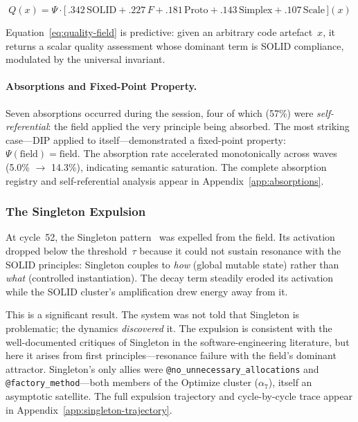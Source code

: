 \begin{eqbox}
\begin{equation}\label{eq:quality-field}
Q(x) = \Psi \!\cdot\! \bigl[\,
  .342\,\text{SOLID}
  + .227\,F
  + .181\,\text{Proto}
  + .143\,\text{Simplex}
  + .107\,\text{Scale}
\,\bigr](x)
\end{equation}
\end{eqbox}

\noindent
Equation~\eqref{eq:quality-field} is predictive: given an arbitrary
code artefact~$x$, it returns a scalar quality assessment
whose dominant term is SOLID compliance, modulated by the universal
invariant.

\paragraph*{Absorptions and Fixed-Point Property.}

Seven absorptions occurred during the session, four of which (57\%)
were \emph{self-referential}: the field applied the very principle
being absorbed.  The most striking case---DIP applied to
itself---demonstrated a fixed-point property: $\Psi(\text{field}) =
\text{field}$.  The absorption rate accelerated monotonically across
waves (5.0\% $\to$ 14.3\%), indicating semantic saturation.  The
complete absorption registry and self-referential analysis appear in
Appendix~\ref{app:absorptions}.

\subsubsection{The Singleton Expulsion}

At cycle~52, the Singleton pattern~\cite{gamma1994design} was expelled
from the field.  Its activation dropped below the threshold~$\tau$
because it could not sustain resonance with the SOLID principles:
Singleton couples to \emph{how} (global mutable state) rather than
\emph{what} (controlled instantiation).  The decay term steadily
eroded its activation while the SOLID cluster's amplification drew
energy away from it.

This is a significant result.  The system was not told that Singleton
is problematic; the dynamics \emph{discovered} it.  The expulsion is
consistent with the well-documented critiques of Singleton in the
software-engineering literature, but here it arises from first
principles---resonance failure with the field's dominant attractor.
Singleton's only allies were \texttt{@no\_unnecessary\_allocations}
and \texttt{@factory\_method}---both members of the Optimize cluster
($\alpha_7$), itself an asymptotic satellite.  The full expulsion
trajectory and cycle-by-cycle trace appear in
Appendix~\ref{app:singleton-trajectory}.

